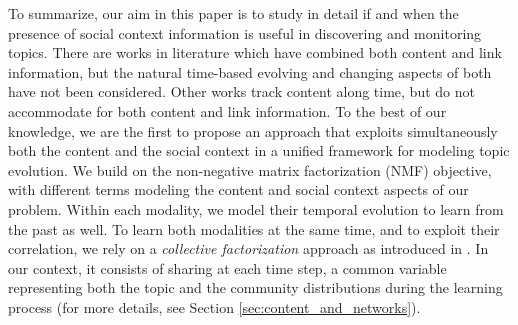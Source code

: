 To summarize, our aim in this paper is to study in detail if and when the presence of social
context information is useful in discovering and monitoring topics. 
There are works in literature which have combined both content and link information, but
the natural time-based evolving and changing aspects of both have not been considered. 
Other works track content along time, but do not accommodate
for both content and link information. 
To the best of our knowledge, we are the first to propose an approach that exploits simultaneously
 both the content and the social context  in a unified framework for modeling topic evolution.  
We build on the non-negative matrix factorization (NMF) objective, with
different terms modeling the content and social context aspects of our problem.  Within each modality, we model their
temporal evolution to learn from the past as well.  To learn both modalities at the same time, and 
to exploit their correlation, 
we rely on a \emph{collective factorization} approach as introduced in \cite{singh:2008}. 
In our context, it consists of sharing at each time step, a common variable
representing both the topic and the community distributions 
during the learning process (for more details, see Section \ref{sec:content_and_networks}).

